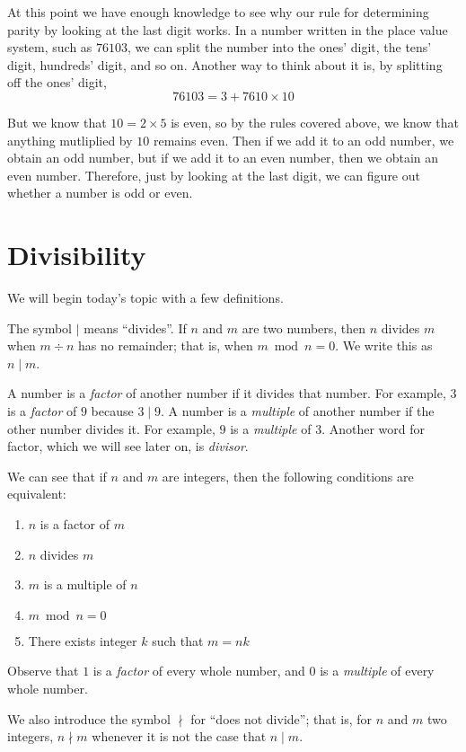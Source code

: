 \documentclass[a4paper,10pt]{report}
\begin{document}
At this point we have enough knowledge to see why our rule for determining
parity by looking at the last digit works. In a number written in the place
value system, such as \(76103\), we can split the number into the ones' digit,
the tens' digit, hundreds' digit, and so on. Another way to think about it is,
by splitting off the ones' digit, \[
 76103 = 3 + 7610 \times 10
\]

But we know that \(10=2\times5\) is even, so by the rules covered above, we
know that anything mutliplied by \(10\) remains even. Then if we add it to an
odd number, we obtain an odd number, but if we add it to an even number, then
we obtain an even number. Therefore, just by looking at the last digit, we can
figure out whether a number is odd or even.

\section{Divisibility}

We will begin today's topic with a few definitions.

The symbol \(\mid\) means ``divides''. If \(n\) and \(m\) are two numbers, then
\(n\) divides \(m\) when \(m \div n\) has no remainder; that is, when \(m \bmod
n = 0\). We write this as \(n \mid m\).

A number is a \emph{factor} of another number if it divides that number. For
example, \(3\) is a \emph{factor} of \(9\) because \(3 \mid 9\). A number is a
\emph{multiple} of another number if the other number divides it. For example,
\(9\) is a \emph{multiple} of \(3\). Another word for factor, which we will see
later on, is \emph{divisor}.

We can see that if \(n\) and \(m\) are integers, then the following conditions
are \gls{equivalent}:

\begin{enumerate}
  \item \(n\) is a factor of \(m\)
  \item \(n\) divides \(m\)
  \item \(m\) is a multiple of \(n\)
  \item \(m \bmod n = 0\)
  \item There exists integer \(k\) such that \(m = nk\)
\end{enumerate}

Observe that \(1\) is a \emph{factor} of every whole number, and \(0\) is a
\emph{multiple} of every whole number.

We also introduce the symbol \(\nmid\) for ``does not divide''; that is, for
\(n\) and \(m\) two integers, \(n \nmid m\) whenever it is not the case that
\(n \mid m\).
\end{document}
